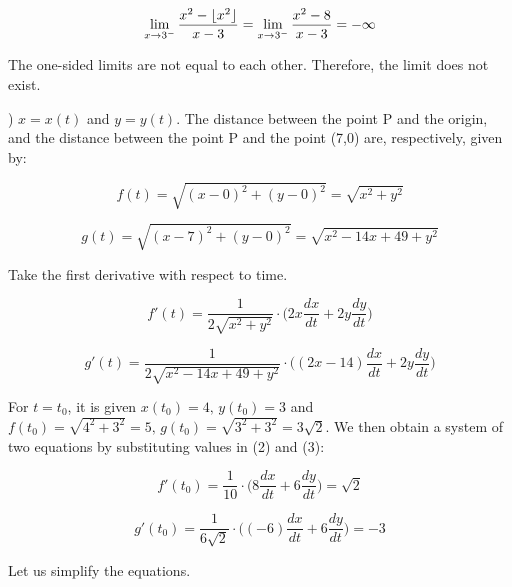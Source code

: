 \documentclass{article}
\DeclarePairedDelimiter\floor{\lfloor}{\rfloor}
\begin{document}
\begin{equation*} \lim_{x\to 3^-} \frac{x^2-\floor{x^2}}{x-3} = \lim_{x\to 3^-}\frac{x^2-8}{x-3} = -\infty\end{equation*}

\hfill

\noindent The one-sided limits are not equal to each other. Therefore, the limit does not exist.

\hfill

) $x=x(t)$ and $y=y(t)$. The distance between the point P and the origin, and the distance between the point P and the point (7,0) are, respectively, given by:

\begin{equation*}f(t) = \sqrt{(x-0)^2 + (y-0)^2} = \sqrt{x^2+y^2}\end{equation*}

\begin{equation*}g(t) = \sqrt{(x-7)^2 + (y-0)^2} = \sqrt{x^2-14x +49+y^2}\end{equation*}

\hfill

\noindent Take the first derivative with respect to time.

\begin{equation}f'(t) =\frac{1}{2\sqrt{x^2+y^2}}\cdot\Big(2x\frac{dx}{dt} + 2y\frac{dy}{dt}\Big)\end{equation}

\begin{equation}g'(t) =\frac{1}{2\sqrt{x^2-14x +49+y^2}}\cdot\Big((2x-14)\frac{dx}{dt} + 2y\frac{dy}{dt}\Big)\end{equation}

\hfill

\noindent For $t=t_0$, it is given $x(t_0) = 4,\,y(t_0) = 3$ and $f(t_0) = \sqrt{4^2 +3^2} = 5,\,g(t_0) = \sqrt{3^2 + 3^2} = 3\sqrt{2}$. We then obtain a system of two equations by substituting values in (2) and (3):

\begin{equation*}f'(t_0) =\frac{1}{10}\cdot\Big(8\frac{dx}{dt}+6\frac{dy}{dt}\Big) = \sqrt{2} \end{equation*}

\begin{equation*}g'(t_0) =\frac{1}{6\sqrt{2}}\cdot\Big((-6)\frac{dx}{dt} + 6\frac{dy}{dt}\Big) = -3\end{equation*}

\hfill

\noindent Let us simplify the equations.
\end{document}
